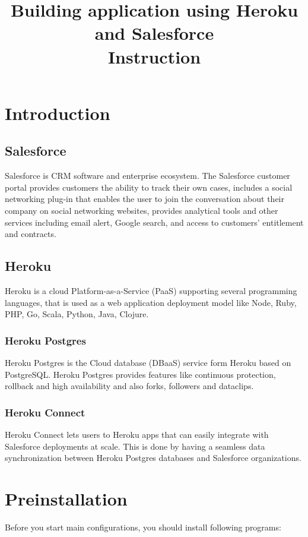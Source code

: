 \documentclass[12pt,a4paper]{article}
\begin{document}
\title{Building application using Heroku and Salesforce\\ \linespread{2} \huge Instruction   }


\maketitle
\newpage
\tableofcontents
\newpage

\section{Introduction}
\subsection{Salesforce}
Salesforce is CRM software and enterprise ecosystem. The Salesforce customer portal provides customers the ability to track their own cases, includes a social networking plug-in that enables the user to join the conversation about their company on social networking websites, provides analytical tools and other services including email alert, Google search, and access to customers' entitlement and contracts.\cite{cos}
\subsection{Heroku}
Heroku is a cloud Platform-as-a-Service (PaaS) supporting several programming languages, that is used as a web application deployment model like Node, Ruby, PHP, Go, Scala, Python, Java, Clojure. \cite{wiki}
\subsubsection{Heroku Postgres}
Heroku Postgres is the Cloud database (DBaaS) service form Heroku based on PostgreSQL. Heroku Postgres provides features like continuous protection, rollback and high availability and also forks, followers and dataclips.\cite{wiki}
\subsubsection{Heroku Connect}
Heroku Connect lets users to Heroku apps that can easily integrate with Salesforce deployments at scale. This is done by having a seamless data synchronization between Heroku Postgres databases and Salesforce organizations.\cite{wiki}
\section{Preinstallation}
Before you start main configurations, you should install following programs:
\end{document}
